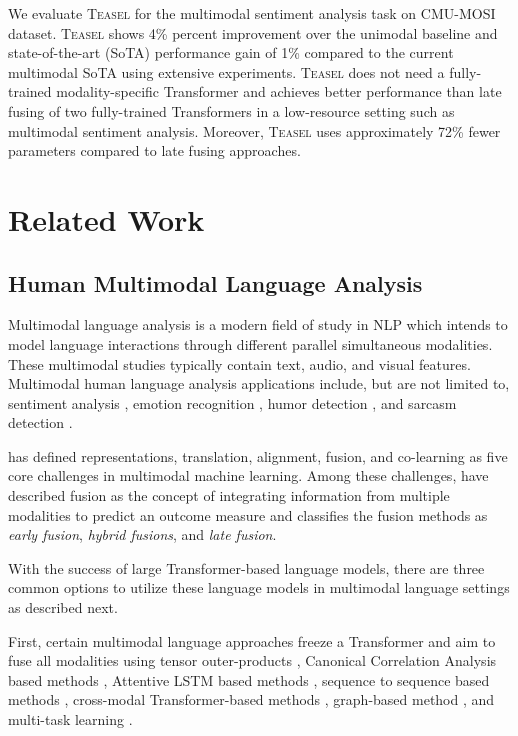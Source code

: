 \documentclass[letterpaper]{article} \usepackage{spconf,amsmath,graphicx}
\newcommand{\teasel}{\textsc{Teasel }}
\begin{document}
We evaluate \teasel for the multimodal sentiment analysis task on CMU-MOSI \cite{zadeh2016mosi} dataset. \teasel shows 4\% percent improvement over the unimodal baseline and state-of-the-art (SoTA) performance gain of 1\% compared to the current multimodal SoTA using extensive experiments. \teasel does not need a fully-trained modality-specific Transformer and achieves better performance than late fusing of two fully-trained Transformers in a low-resource setting such as multimodal sentiment analysis. Moreover, \teasel uses approximately 72\% fewer parameters compared to late fusing approaches. 





\section{Related Work}
\label{sec:related works}

\subsection{Human Multimodal Language Analysis}

Multimodal language analysis is a modern field of study in NLP which intends to model language interactions through different parallel simultaneous modalities. These multimodal studies typically contain text, audio, and visual features. Multimodal human language analysis applications include, but are not limited to, sentiment analysis \cite{zadeh2016mosi}, emotion recognition \cite{busso2008iemocap, zadeh2018multimodal}, humor detection \cite{hasan2019ur}, and sarcasm detection \cite{castro2019towards}.

\cite{baltruvsaitis2018multimodal} has defined representations, translation, alignment, fusion, and co-learning as five core challenges in multimodal machine learning. Among these challenges, \cite{baltruvsaitis2018multimodal} have described fusion as the concept of integrating information from multiple modalities to predict an outcome measure and classifies the fusion methods as \textit{early fusion}, \textit{hybrid fusions}, and \textit{late fusion}.


With the success of large Transformer-based language models, there are three common options to utilize these language models in multimodal language settings as described next.

First, certain multimodal language approaches freeze a Transformer and aim to fuse all modalities using tensor outer-products \cite{zadeh2017tensor,liu2018efficient}, Canonical Correlation Analysis based methods \cite{sun2020learning}, Attentive LSTM based methods \cite{zadeh2018multi, zadeh2018memory, chen2017multimodal, wang2019words, zadeh2018multimodal}, sequence to sequence based methods \cite{pham2019found}, cross-modal Transformer-based methods \cite{tsai2019MULT, zadeh2019factorized, hasan2021humor}, graph-based method \cite{yang2020mtgat}, and multi-task learning \cite{yu2021le}.
\end{document}

